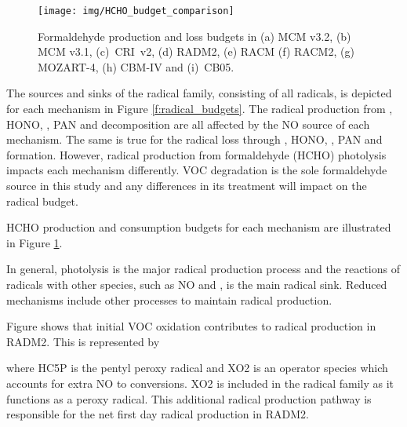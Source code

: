 \begin{figure}
    \centering
    \texttt{[image: img/HCHO\_budget\_comparison]}
    \vspace{0mm}
    \caption{Formaldehyde production and loss budgets in (a) MCM v3.2, (b) MCM v3.1, \mbox{(c) CRI v2}, (d) RADM2, (e) RACM (f) RACM2, (g) MOZART-4, (h) CBM-IV and \mbox{(i) CB05}.}
    \vspace{-4mm}
    \label{f:HCHO_budgets} 
\end{figure} 

The sources and sinks of the radical family, consisting of all radicals, is depicted for each mechanism in Figure \ref{f:radical_budgets}.
The radical production from , HONO, , PAN and  decomposition are all affected by the NO source of each mechanism.
The same is true for the radical loss through , HONO, , PAN and  formation.
However, radical production from formaldehyde (HCHO) photolysis impacts each mechanism differently.
VOC degradation is the sole formaldehyde source in this study and any differences in its treatment will impact on the radical budget.

HCHO production and consumption budgets for each mechanism are illustrated in Figure \ref{f:HCHO_budgets}.

In general, photolysis is the major radical production process and the reactions of radicals with other species, such as NO and , is the main radical sink. 
Reduced mechanisms include other processes to maintain radical production.

Figure shows that initial VOC oxidation contributes to radical production in RADM2. 
This is represented by
\begin{reactionlist}
\end{reactionlist}
where HC5P is the pentyl peroxy radical and XO2 is an operator species which accounts for extra NO to  conversions. 
XO2 is included in the radical family as it functions as a peroxy radical. 
This additional radical production pathway is responsible for the net first day radical production in RADM2.

